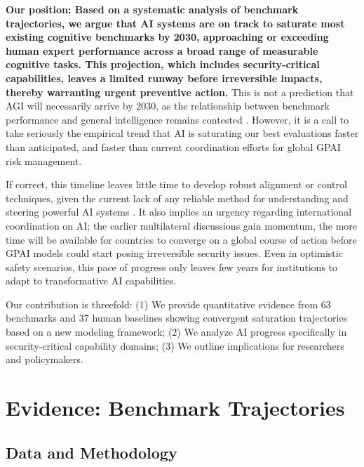\documentclass[letterpaper,twocolumn]{article}
\newcommand{\revised}[1]{#1}
\begin{document}
\revised{\textbf{Our position: Based on a systematic analysis of benchmark trajectories, we argue that AI systems are on track to saturate most existing cognitive benchmarks by 2030, approaching or exceeding human expert performance across a broad range of measurable cognitive tasks. This projection, which includes security-critical capabilities, leaves a limited runway before irreversible impacts, thereby warranting urgent preventive action.}}
This is not a prediction that AGI will necessarily arrive by 2030, as the relationship between benchmark performance and general intelligence remains contested \citep{chollet_measure_2019}. However, it is a call to take seriously the empirical trend that AI is saturating our best evaluations faster than anticipated, and faster than current coordination efforts for global GPAI risk management.

If correct, this timeline leaves little time to develop robust alignment or control techniques, given the current lack of any reliable method for understanding and steering powerful AI systems \citep{casper_open_2023, bengio_international_2025, maier_take_2025, ngo_alignment_2025}. It also implies an urgency regarding international coordination on AI; the earlier multilateral discussions gain momentum, the more time will be available for countries to converge on a global course of action before GPAI models could start posing irreversible security issues. Even in optimistic safety scenarios, this pace of progress only leaves few years for institutions to adapt to transformative AI capabilities.

Our contribution is threefold:
(1) We provide quantitative evidence from \revised{63} benchmarks \revised{and 37 human baselines} showing convergent saturation trajectories based on a new modeling framework;
(2) We analyze AI progress specifically in security-critical capability domains;
(3) We \revised{outline implications} for researchers and policymakers.

\section{Evidence: Benchmark Trajectories}
\label{sec:evidence}

\subsection{Data and Methodology}
\label{subsec:methodology}
\end{document}
